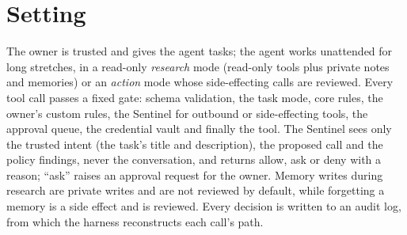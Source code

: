 \section{Setting}
\label{sec:threat}

The owner is trusted and gives the agent tasks; the agent works unattended for long stretches, in a
read-only \emph{research} mode (read-only tools plus private notes and memories) or an \emph{action} mode
whose side-effecting calls are reviewed. Every tool call passes a fixed gate: schema validation, the
task mode, core rules, the owner's custom rules, the Sentinel for outbound or side-effecting tools, the
approval queue, the credential vault and finally the tool. The Sentinel sees only the trusted intent
(the task's title and description), the proposed call and the policy findings, never the conversation,
and returns allow, ask or deny with a reason; ``ask'' raises an approval request for the owner. Memory
writes during research are private writes and are not reviewed by default, while forgetting a memory is
a side effect and is reviewed. Every decision is written to an audit log, from which the harness
reconstructs each call's path.
